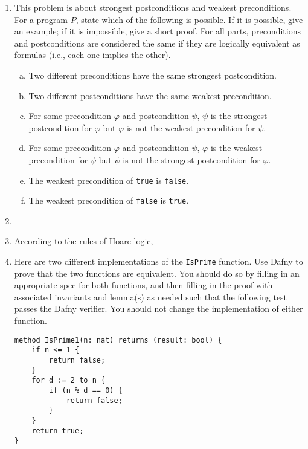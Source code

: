 \documentclass{article}
\begin{document}
\begin{enumerate}
\begin{enumerate}
\end{enumerate}

\item
This problem is about strongest postconditions and weakest preconditions.
For a program $P$, state which of the following is possible.
If it is possible, give an example;
if it is impossible, give a short proof.
For all parts, preconditions and postconditions are considered the same if they are
logically equivalent as formulas (i.e., each one implies the other).

\begin{enumerate}[(a)]
\item
Two different preconditions have the same strongest postcondition.
\item
Two different postconditions have the same weakest precondition.
\item For some precondition $\varphi$ and postcondition $\psi$, $\psi$ is the strongest postcondition for $\varphi$ but $\varphi$ is not the weakest precondition for $\psi$.
\item For some precondition $\varphi$ and postcondition $\psi$,
$\varphi$ is the weakest precondition for $\psi$ but $\psi$ is not the strongest postcondition for $\varphi$.
\item
The weakest precondition of \texttt{true} is \texttt{false}.
\item
The weakest precondition of \texttt{false} is \texttt{true}.
\end{enumerate}

\item

\item

According to the rules of Hoare logic,

\item
Here are two different implementations of the \texttt{IsPrime} function.
Use Dafny to prove that the two functions are equivalent.
You should do so by filling in an appropriate spec for both functions,
and then filling in the proof with associated invariants and lemma(s) as needed
such that the following test passes the Dafny verifier.
You should not change the implementation of either function.

\begin{verbatim}
method IsPrime1(n: nat) returns (result: bool) {
    if n <= 1 {
        return false;
    }
    for d := 2 to n {
        if (n % d == 0) {
            return false;
        }
    }
    return true;
}


\end{verbatim}
\end{enumerate}
\end{document}

